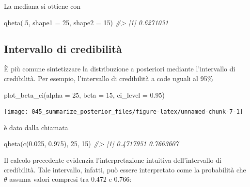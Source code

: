 \documentclass[
  11pt,
  italian,
  a4paper,
  extrafontsizes,onecolumn,openright
  ]{memoir}
\newenvironment{Shaded}{\begin{snugshade}}{\end{snugshade}}
\newcommand{\AttributeTok}[1]{\textcolor[rgb]{0.77,0.63,0.00}{#1}}
\newcommand{\CommentTok}[1]{\textcolor[rgb]{0.56,0.35,0.01}{\textit{#1}}}
\newcommand{\DecValTok}[1]{\textcolor[rgb]{0.00,0.00,0.81}{#1}}
\newcommand{\FloatTok}[1]{\textcolor[rgb]{0.00,0.00,0.81}{#1}}
\newcommand{\FunctionTok}[1]{\textcolor[rgb]{0.00,0.00,0.00}{#1}}
\newcommand{\NormalTok}[1]{#1}
\begin{document}
La mediana si ottiene con

\begin{Shaded}
\begin{Highlighting}[]
\FunctionTok{qbeta}\NormalTok{(.}\DecValTok{5}\NormalTok{, }\AttributeTok{shape1 =} \DecValTok{25}\NormalTok{, }\AttributeTok{shape2 =} \DecValTok{15}\NormalTok{)}
\CommentTok{\#\textgreater{} [1] 0.6271031}
\end{Highlighting}
\end{Shaded}

\hypertarget{intervallo-di-credibilituxe0-1}{%
\subsection{Intervallo di credibilità}\label{intervallo-di-credibilituxe0-1}}

È più comune sintetizzare la distribuzione a posteriori mediante l'intervallo di credibilità. Per esempio, l'intervallo di credibilità a code uguali al 95\%

\begin{Shaded}
\begin{Highlighting}[]
\FunctionTok{plot\_beta\_ci}\NormalTok{(}\AttributeTok{alpha =} \DecValTok{25}\NormalTok{, }\AttributeTok{beta =} \DecValTok{15}\NormalTok{, }\AttributeTok{ci\_level =} \FloatTok{0.95}\NormalTok{)}
\end{Highlighting}
\end{Shaded}

\begin{center}\texttt{[image: 045\_summarize\_posterior\_files/figure-latex/unnamed-chunk-7-1]} \end{center}

\noindent
è dato dalla chiamata

\begin{Shaded}
\begin{Highlighting}[]
\FunctionTok{qbeta}\NormalTok{(}\FunctionTok{c}\NormalTok{(}\FloatTok{0.025}\NormalTok{, }\FloatTok{0.975}\NormalTok{), }\DecValTok{25}\NormalTok{, }\DecValTok{15}\NormalTok{)}
\CommentTok{\#\textgreater{} [1] 0.4717951 0.7663607}
\end{Highlighting}
\end{Shaded}

\noindent
Il calcolo precedente evidenzia l'interpretazione intuitiva dell'intervallo di credibilità. Tale intervallo, infatti, può essere interpretato come la probabilità che \(\theta\) assuma valori compresi tra 0.472 e 0.766:
\end{document}
